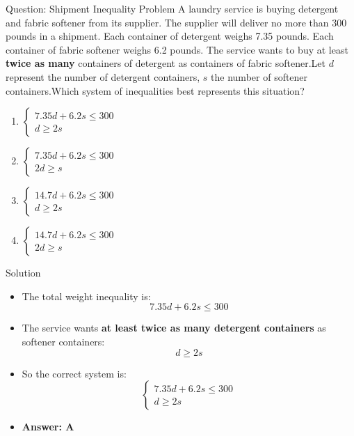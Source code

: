 \documentclass{beamer}
\begin{document}
\begin{frame}{Question: Shipment Inequality Problem}
\small
A laundry service is buying detergent and fabric softener from its supplier. The supplier will deliver no more than 300 pounds in a shipment.
Each container of detergent weighs 7.35 pounds.
 Each container of fabric softener weighs 6.2 pounds.
 The service wants to buy at least \textbf{twice as many} containers of detergent as containers of fabric softener.Let $d$ represent the number of detergent containers, $s$ the number of softener containers.Which system of inequalities best represents this situation?

\begin{enumerate}
    \item[A.] 
    $\begin{cases}
    7.35d + 6.2s \leq 300 \\
    d \geq 2s
    \end{cases}$
    
    \item[B.] 
    $\begin{cases}
    7.35d + 6.2s \leq 300 \\
    2d \geq s
    \end{cases}$
    
    \item[C.] 
    $\begin{cases}
    14.7d + 6.2s \leq 300 \\
    d \geq 2s
    \end{cases}$
    
    \item[D.] 
    $\begin{cases}
    14.7d + 6.2s \leq 300 \\
    2d \geq s
    \end{cases}$
\end{enumerate}
\end{frame}

\begin{frame}{Solution}
\small
\begin{itemize}
    \item The total weight inequality is:
    \[
    7.35d + 6.2s \leq 300
    \]
    
    \item The service wants \textbf{at least twice as many detergent containers} as softener containers:
    \[
    d \geq 2s
    \]
    
    \item So the correct system is:
    \[
    \boxed{
    \begin{cases}
    7.35d + 6.2s \leq 300 \\
    d \geq 2s
    \end{cases}
    }
    \]
    
    \item \textbf{Answer: A}
\end{itemize}
\end{frame}
\end{document}

